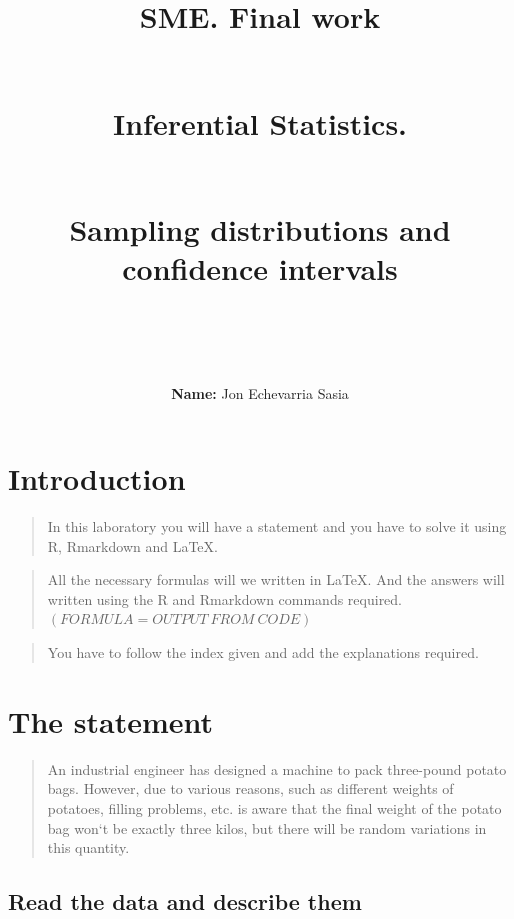 \documentclass[
]{article}
\title{SME. Final work\\
\strut \\
Inferential Statistics.\\
\strut \\
Sampling distributions and confidence intervals\\
\strut \\}
\author{\textbf{Name:} Jon Echevarria Sasia}
\date{\hfill\break
January 10, 2024\\
\strut \\
Table of contents\\}
\begin{document}
\maketitle

{
\setcounter{tocdepth}{4}
\tableofcontents
}
\begin{quote}
\end{quote}

\newpage

\hypertarget{introduction}{%
\section{Introduction}\label{introduction}}

\begin{quote}
In this laboratory you will have a statement and you have to solve it
using R, Rmarkdown and LaTeX.
\end{quote}

\begin{quote}
All the necessary formulas will we written in LaTeX. And the answers
will written using the R and Rmarkdown commands required.
\emph{\((FORMULA = OUTPUT\  FROM\  CODE)\)}
\end{quote}

\begin{quote}
You have to follow the index given and add the explanations required.
\end{quote}

\vspace{2cm}

\hypertarget{the-statement}{%
\section{The statement}\label{the-statement}}

\begin{quote}
An industrial engineer has designed a machine to pack three-pound potato
bags. However, due to various reasons, such as different weights of
potatoes, filling problems, etc. is aware that the final weight of the
potato bag won`t be exactly three kilos, but there will be random
variations in this quantity.
\end{quote}

\vspace{2cm}

\hypertarget{read-the-data-and-describe-them}{%
\subsection{Read the data and describe
them}\label{read-the-data-and-describe-them}}
\end{document}
